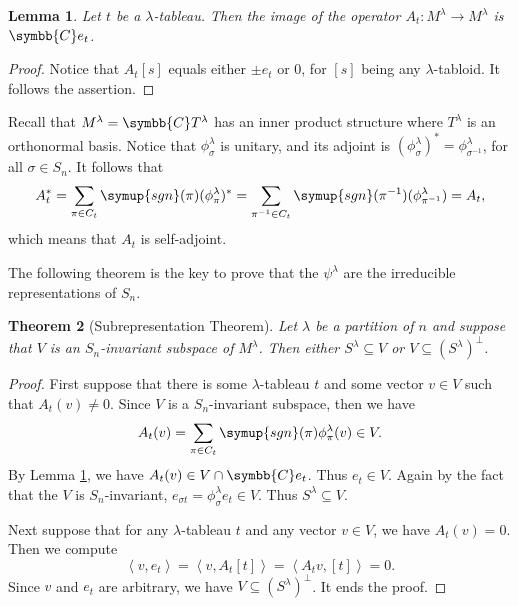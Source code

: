 \documentclass{assignment}[2019/10/15]
\newcommand{\lr}[3]{\left#1#3\right#2}
\theoremstyle{plain}
\newtheorem{theorem}{Theorem}[section]
\newtheorem{lemma}[theorem]{Lemma}
\newcommand{\BC}{\symbb{C}}
\newcommand{\sgn}{\mathop{}\!\symup{sgn}}
\numberwithin{equation}{section}
\begin{document}
    \begin{lemma}\label{lem: At}
        Let $t$ be a $\lambda$-tableau. Then the image of the operator $A_t\colon M^\lambda\to M^\lambda$ is $\BC e_t$.
    \end{lemma}
    \begin{proof}
        Notice that $A_t[s]$ equals either $\pm e_t$ or 0, for $[s]$ being any $\lambda$-tabloid. It follows the assertion.
    \end{proof}

    Recall that $M^\lambda = \BC T^\lambda$ has an inner product structure where $T^\lambda$ is an orthonormal basis. Notice that $\phi^\lambda_\sigma$ is unitary, and its adjoint is $(\phi^\lambda_\sigma)^*=\phi^\lambda_{\sigma^{-1}}$, for all $\sigma\in S_n$. It follows that
    \begin{equation}
        A_t^* = \sum_{\pi\in C_t}\sgn(\pi)(\phi^\lambda_\pi)^* = \sum_{\pi^{-1}\in C_t}\sgn(\pi^{-1})(\phi^\lambda_{\pi^{-1}}) = A_t,
    \end{equation}
    which means that $A_t$ is self-adjoint.

    The following theorem is the key to prove that the $\psi^\lambda$ are the irreducible representations of $S_n$.

    \begin{theorem}[Subrepresentation Theorem]\label{thm: subrepr}
        Let $\lambda$ be a partition of $n$ and suppose that $V$ is an $S_n$-invariant subspace of $M^\lambda$. Then either $S^\lambda\subseteq V$ or $V\subseteq (S^\lambda)^\perp$.
    \end{theorem}

    \begin{proof}
        First suppose that there is some $\lambda$-tableau $t$ and some vector $v\in V$ such that $A_t(v)\neq 0$. Since $V$ is a $S_n$-invariant subspace, then we have
        \begin{equation}
            A_t(v)=\sum_{\pi\in C_t}\sgn(\pi)\phi_\pi^\lambda(v)\in V.
        \end{equation}
        By Lemma \ref{lem: At}, we have $A_t(v)\in V\cap \BC e_t$. Thus $e_t\in V$. Again by the fact that the $V$ is $S_n$-invariant, $e_{\sigma t} = \phi^\lambda_\sigma e_t\in V$. Thus $S^\lambda\subseteq V$.

        Next suppose that for any $\lambda$-tableau $t$ and any vector $v\in V$, we have $A_t(v) = 0$. Then we compute
        \begin{equation}
            \lr<>{v, e_t} = \lr<>{v, A_t[t]} = \lr<>{A_tv, [t]} = 0.
        \end{equation}
        Since $v$ and $e_t$ are arbitrary, we have $V\subseteq (S^\lambda)^\perp$. It ends the proof.
    \end{proof}
\end{document}

